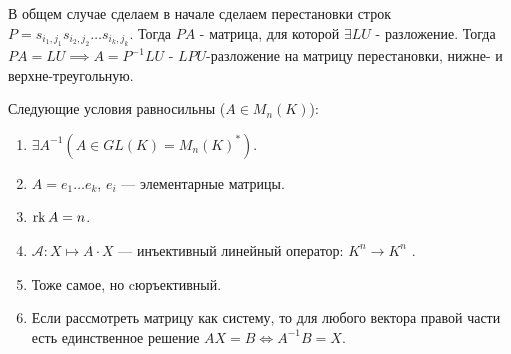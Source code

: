 В общем случае сделаем в начале сделаем перестановки строк $P = s_{i_1,j_1}s_{i_2,j_2}\ldots s_{i_k,j_k}$. Тогда $PA$ - матрица, для которой $\exists LU$ - разложение. Тогда $PA = LU \implies A = P^{-1}LU$ - $LPU$-разложение на матрицу перестановки, нижне- и верхне-треугольную.
\begin{theorem}
    Следующие условия равносильны ($A \in M_n(K)$): 
    \begin{enumerate}
        \item $\exists A^{-1} (A \in GL(K) = M_n(K)^*)$.
        \item  $A = e_1 \ldots e_k$, $e_i$ --- элементарные матрицы. 
        \item $\operatorname{rk} A = n$.
        \item  $\mathcal{A}\!: X \mapsto A \cdot X$ --- инъективный линейный оператор: $K^n \to K^n$ .
        \item Тоже самое, но cюръективный.
        \item Если рассмотреть матрицу как систему, то для любого вектора правой части есть единственное решение  $AX = B \iff A^{-1}B = X$.
    \end{enumerate}
\end{theorem}
